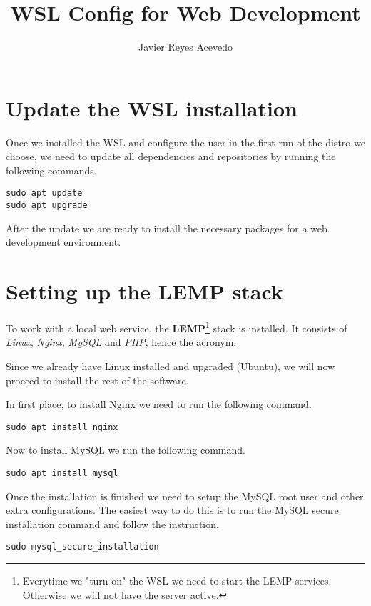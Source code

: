 \documentclass[twocolumn]{article}
\title{\textbf{WSL Config for Web Development}}
\author{Javier Reyes Acevedo}
\begin{document}
\maketitle

\section{Update the WSL installation}
Once we installed the WSL and configure the user in the first run of the distro we choose, we need to update all dependencies and repositories by running the following commands.
	
\begin{lstlisting}
sudo apt update
sudo apt upgrade
\end{lstlisting}

After the update we are ready to install the necessary packages for a web development environment.

\section{Setting up the LEMP stack}
To work with a local web service, the \textbf{LEMP}\footnote{Everytime we "turn on" the WSL we need to start the LEMP services. Otherwise we will not have the server active.} stack is installed. It consists of \textit{Linux}, \textit{Nginx}, \textit{MySQL} and \textit{PHP}, hence the acronym.

Since we already have Linux installed and upgraded (Ubuntu), we will now proceed to install the rest of the software.

In first place, to install Nginx we need to run the following command.

\begin{lstlisting}
sudo apt install nginx
\end{lstlisting}

Now to install MySQL we run the following command.

\begin{lstlisting}
sudo apt install mysql
\end{lstlisting}

Once the installation is finished we need to setup the MySQL root user and other extra configurations. The easiest way to do this is to run the MySQL secure installation command and follow the instruction.

\begin{lstlisting}
sudo mysql_secure_installation
\end{lstlisting}
\end{document}
